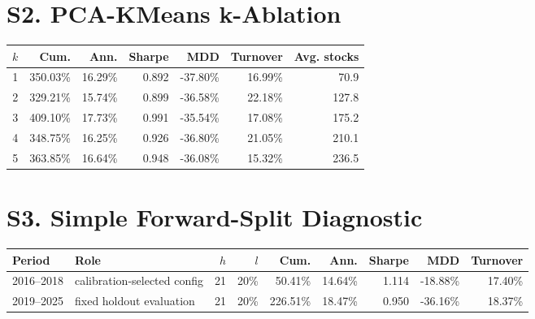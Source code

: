 \documentclass[10pt]{article}
\begin{document}
\section*{S2. PCA-KMeans k-Ablation}
\begin{table}[h]
\centering
\small
\begin{tabular}{rrrrrrr}
\toprule
$k$ & Cum. & Ann. & Sharpe & MDD & Turnover & Avg. stocks \\
\midrule
1 & 350.03\% & 16.29\% & 0.892 & -37.80\% & 16.99\% & 70.9 \\
2 & 329.21\% & 15.74\% & 0.899 & -36.58\% & 22.18\% & 127.8 \\
3 & 409.10\% & 17.73\% & 0.991 & -35.54\% & 17.08\% & 175.2 \\
4 & 348.75\% & 16.25\% & 0.926 & -36.80\% & 21.05\% & 210.1 \\
5 & 363.85\% & 16.64\% & 0.948 & -36.08\% & 15.32\% & 236.5 \\
\bottomrule
\end{tabular}
\end{table}

\section*{S3. Simple Forward-Split Diagnostic}
\begin{table}[h]
\centering
\small
\begin{tabular}{llrrrrrrr}
\toprule
Period & Role & $h$ & $l$ & Cum. & Ann. & Sharpe & MDD & Turnover \\
\midrule
2016--2018 & calibration-selected config & 21 & 20\% & 50.41\% & 14.64\% & 1.114 & -18.88\% & 17.40\% \\
2019--2025 & fixed holdout evaluation & 21 & 20\% & 226.51\% & 18.47\% & 0.950 & -36.16\% & 18.37\% \\
\bottomrule
\end{tabular}
\end{table}
\end{document}
